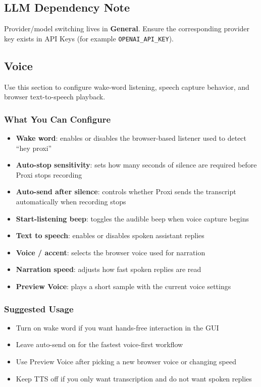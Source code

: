 \documentclass{article}
\begin{document}
\subsection{LLM Dependency Note}

Provider/model switching lives in \textbf{General}. Ensure the corresponding provider key exists in API Keys (for example \texttt{OPENAI\_API\_KEY}).

\subsection{Voice}

Use this section to configure wake-word listening, speech capture behavior, and browser text-to-speech playback.

\subsubsection{What You Can Configure}
\begin{itemize}
	\item \textbf{Wake word}: enables or disables the browser-based listener used to detect ``hey proxi''
	\item \textbf{Auto-stop sensitivity}: sets how many seconds of silence are required before Proxi stops recording
	\item \textbf{Auto-send after silence}: controls whether Proxi sends the transcript automatically when recording stops
	\item \textbf{Start-listening beep}: toggles the audible beep when voice capture begins
	\item \textbf{Text to speech}: enables or disables spoken assistant replies
	\item \textbf{Voice / accent}: selects the browser voice used for narration
	\item \textbf{Narration speed}: adjusts how fast spoken replies are read
	\item \textbf{Preview Voice}: plays a short sample with the current voice settings
\end{itemize}

\subsubsection{Suggested Usage}
\begin{itemize}
	\item Turn on wake word if you want hands-free interaction in the GUI
	\item Leave auto-send on for the fastest voice-first workflow
	\item Use Preview Voice after picking a new browser voice or changing speed
	\item Keep TTS off if you only want transcription and do not want spoken replies
\end{itemize}
\end{document}
